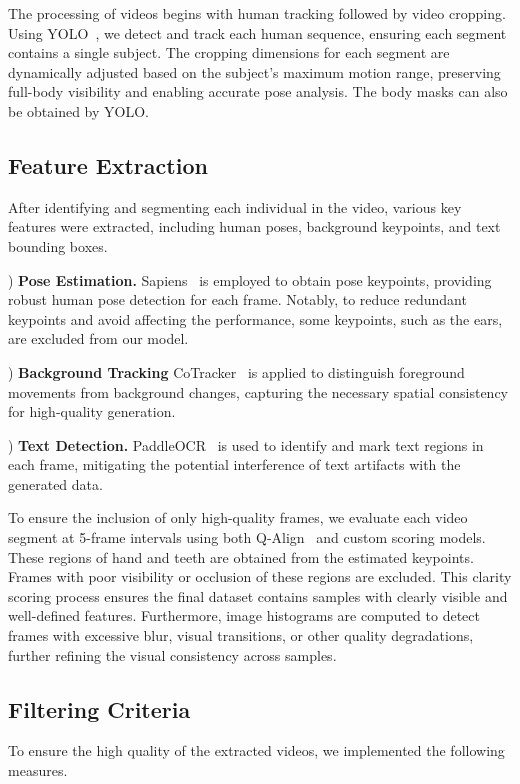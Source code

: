 The processing of videos begins with human tracking followed by video cropping. Using YOLO~\cite{Jocher_Ultralytics_YOLO_2023}, we detect and track each human sequence, ensuring each segment contains a single subject. The cropping dimensions for each segment are dynamically adjusted based on the subject’s maximum motion range, preserving full-body visibility and enabling accurate pose analysis. The body masks can also be obtained by YOLO.

\subsection{Feature Extraction}
After identifying and segmenting each individual in the video, various key features were extracted, including human poses, background keypoints, and text bounding boxes.

) \textbf{Pose Estimation.} Sapiens~\cite{khirodkar2024sapiens} is employed to obtain pose keypoints, providing robust human pose detection for each frame. Notably, to reduce redundant keypoints and avoid affecting the performance, some keypoints, such as the ears, are excluded from our model.

) \textbf{Background Tracking} CoTracker~\cite{karaev2023cotracker} is applied to distinguish foreground movements from background changes, capturing the necessary spatial consistency for high-quality generation.

) \textbf{Text Detection.} PaddleOCR~\cite{PaddleOCR} is used to identify and mark text regions in each frame, mitigating the potential interference of text artifacts with the generated data.


To ensure the inclusion of only high-quality frames, we evaluate each video segment at 5-frame intervals using both Q-Align~\cite{wu2023qalign} and custom scoring models. These regions of hand and teeth are obtained from the estimated keypoints. Frames with poor visibility or occlusion of these regions are excluded. This clarity scoring process ensures the final dataset contains samples with clearly visible and well-defined features. Furthermore, image histograms are computed to detect frames with excessive blur, visual transitions, or other quality degradations, further refining the visual consistency across samples.

\subsection{Filtering Criteria}
To ensure the high quality of the extracted videos, we implemented the following measures.

